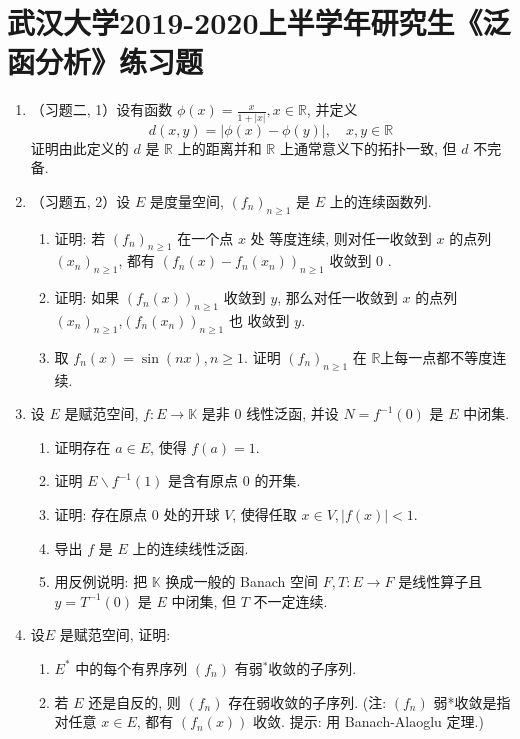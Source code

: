 \section{武汉大学2019-2020上半学年研究生《泛函分析》练习题}
\begin{enumerate}
    \item （习题二, 1）设有函数 $\phi(x)=\frac{x}{1+|x|}, x \in \mathbb{R}$, 并定义
    \[
        d(x, y)=|\phi(x)-\phi(y)|, \quad x, y \in \mathbb{R}
    \]
    证明由此定义的 $d$ 是 $\mathbb{R}$ 上的距离并和 $\mathbb{R}$ 上通常意义下的拓扑一致, 但 $d$ 不完备.
    \item （习题五, 2）设 $E$ 是度量空间, $\left(f_{n}\right)_{n \geq 1}$ 是 $E$ 上的连续函数列. 
        \begin{enumerate}
            \item 证明: 若 $\left(f_{n}\right)_{n \geq 1}$ 在一个点 $x$ 处 等度连续, 则对任一收敛到 $x$ 的点列 $\left(x_{n}\right)_{n \geq 1}$, 都有 $\left(f_{n}(x)-f_{n}\left(x_{n}\right)\right)_{n \geq 1}$ 收敛到 0 . 
            \item 证明: 如果 $\left(f_{n}(x)\right)_{n \geq 1}$ 收敛到 $y$, 那么对任一收敛到 $x$ 的点列 $\left(x_{n}\right)_{n \geq 1}$,$\left(f_{n}\left(x_{n}\right)\right)_{n \geq 1}$ 也
            收敛到 $y$. 
            \item 取 $f_{n}(x)=\sin (n x), n \geq 1$. 证明 $\left(f_{n}\right)_{n \geq 1}$ 在 $\mathbb{R}$上每一点都不等度连续.
        \end{enumerate}
    \item 设 $E$ 是赋范空间, $f: E \rightarrow \mathbb{K}$ 是非 0 线性泛函, 并设 $N=f^{-1}(0)$ 是 $E$ 中闭集.
        \begin{enumerate}
            \item 证明存在 $a \in E$, 使得 $f(a)=1 .$
            \item 证明 $E \backslash f^{-1}(1)$ 是含有原点 0 的开集.
            \item 证明: 存在原点 0 处的开球 $V$, 使得任取 $x \in V,|f(x)|<1$.
            \item 导出 $f$ 是 $E$ 上的连续线性泛函.
            \item 用反例说明: 把 $\mathbb{K}$ 换成一般的 Banach 空间 $F, T: E \rightarrow F$ 是线性算子且 $y=T^{-1}(0)$ 是 $E$ 中闭集, 但 $T$ 不一定连续.
        \end{enumerate}
    \item 设$E$ 是赋范空间, 证明:
        \begin{enumerate}
            \item $E^{*}$ 中的每个有界序列 $\left(f_{n}\right)$ 有弱$^{*}$收敛的子序列.
            \item 若 $E$ 还是自反的, 则 $\left(f_{n}\right)$ 存在弱收敛的子序列.
            (注: $\left(f_{n}\right)$ 弱*收敛是指对任意 $x \in E$, 都有 $\left(f_{n}(x)\right)$ 收敛. 提示: 用 Banach-Alaoglu 定理.)
        \end{enumerate}
\end{enumerate}
